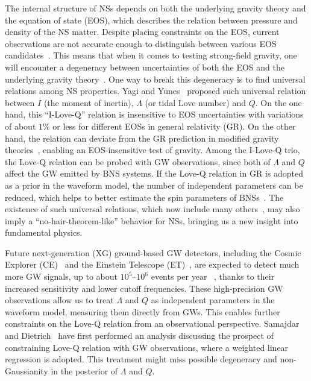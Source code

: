 \documentclass[a4paper,11pt]{article}
\begin{document}
The internal structure of NSs depends on both the underlying gravity theory 
and the equation of state (EOS), which describes the relation between pressure and
density of the NS matter. Despite placing constraints on the EOS, current 
observations are not accurate enough to distinguish between various EOS candidates~\cite{Lattimer:2006xb,Steiner:2010fz,Ozel:2010fw,Hebeler:2013nza,Özel_2013}. 
This means that when it comes to testing strong-field gravity, 
one will encounter a degeneracy between uncertainties of both the
EOS and the underlying gravity theory~\cite{Yagi:2013bca,Yagi:2013awa,Shao:2017gwu,Silva:2020acr,Shao:2022koz}. 
One way to break this degeneracy is to find universal relations among NS properties.
Yagi and Yunes~\cite{Yagi:2013bca,Yagi:2013awa} proposed such universal relation between 
$I$ (the moment of inertia), $\Lambda$ (or tidal Love number) and $Q$. 
On the one hand, this ``I-Love-Q'' relation is insensitive to EOS uncertainties 
with variations of about $1\%$ or less for different EOSs in general relativity (GR). 
On the other hand, the relation can deviate from the GR prediction in modified gravity theories~\cite{Yagi_2017,Gupta:2017vsl,Yunes:2025xwp}, 
enabling an EOS-insensitive test of gravity. Among the I-Love-Q trio, 
the Love-Q relation can be probed with GW observations, 
since both of $\Lambda$ and $Q$ affect the GW emitted by BNS systems. 
If the Love-Q relation in GR is adopted as a prior in the waveform
model, the number of independent parameters can be reduced, which helps to
better estimate the spin parameters of BNSs~\cite{Yagi:2013bca,LIGOScientific:2018cki,
LIGOScientific:2018hze,LIGOScientific:2020aai}. The existence of 
such universal relations, 
which now include many others~\cite{Lau:2009bu,Yagi:2013sva,Maselli:2013mva,Pani:2015nua,Yagi:2016qmr,Gao:2023mwu,Hu:2025gab}, 
may also imply a ``no-hair-theorem-like'' behavior for NSs, bringing us a new 
insight into fundamental physics. 

Future next-generation (XG) ground-based GW detectors, including the Cosmic Explorer 
(CE)~\cite{Reitze:2019iox,Reitze:2019dyk} and the Einstein Telescope (ET)~\cite{Punturo:2010zz,Hild:2010id,Sathyaprakash:2012jk}, 
are expected to
 detect much more GW signals, up to about $10^5$--$10^6$ events per year
~\cite{LIGOScientific:2017zlf,Sathyaprakash:2019yqt,Kalogera:2021bya,Samajdar:2021egv}, 
thanks to their 
increased sensitivity and lower cutoff frequencies. These high-precision GW observations allow us to treat $\Lambda$ and $Q$ as independent parameters in the waveform model, 
measuring them directly from GWs. This enables further constraints on the Love-Q relation from an observational perspective.
Samajdar and Dietrich~\cite{Samajdar:2020xrd} 
have first performed an analysis discussing the prospect of constraining Love-Q 
relation with GW observations, where a weighted linear regression is adopted.
This treatment might miss possible degeneracy and non-Gaussianity in the posterior of $\Lambda$ and $Q$. 
\end{document}
